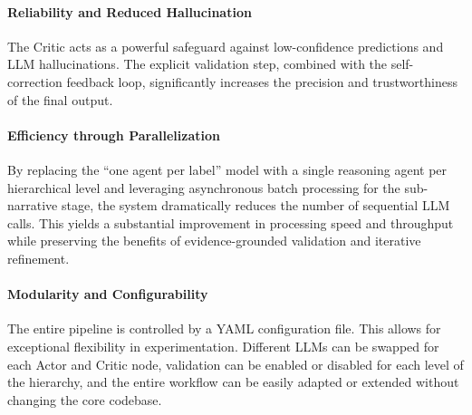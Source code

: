 \paragraph{Reliability and Reduced Hallucination}
The Critic acts as a powerful safeguard against low-confidence predictions and LLM hallucinations. The explicit validation step, combined with the self-correction feedback loop, significantly increases the precision and trustworthiness of the final output.

\paragraph{Efficiency through Parallelization}
By replacing the ``one agent per label'' model with a single reasoning agent per hierarchical level and leveraging asynchronous batch processing for the sub-narrative stage, the system dramatically reduces the number of sequential LLM calls. This yields a substantial improvement in processing speed and throughput while preserving the benefits of evidence-grounded validation and iterative refinement.

\paragraph{Modularity and Configurability}
The entire pipeline is controlled by a YAML configuration file. This allows for exceptional flexibility in experimentation. Different LLMs can be swapped for each Actor and Critic node, validation can be enabled or disabled for each level of the hierarchy, and the entire workflow can be easily adapted or extended without changing the core codebase.